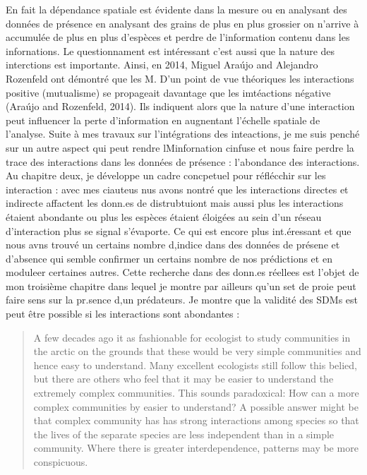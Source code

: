 En fait la dépendance spatiale est évidente dans la mesure ou en
analysant des données de présence en analysant des grains de plus en
plus grossier on n'arrive à accumulée de plus en plus d'espèces et
perdre de l'information contenu dans les infornations. Le questionnament
est intéressant c'est aussi que la nature des interctions est
importante. Ainsi, en 2014, Miguel Araújo and Alejandro Rozenfeld ont
démontré que les M. D'un point de vue théoriques les interactions
positive (mutualisme) se propageait davantage que les imtéactions
négative (Araújo and Rozenfeld, 2014). Ils indiquent alors que la nature
d'une interaction peut influencer la perte d'information en augnentant
l'échelle spatiale de l'analyse. Suite à mes travaux sur l'intégrations
des inteactions, je me suis penché sur un autre aspect qui peut rendre
lMinfornation cinfuse et nous faire perdre la trace des interactions
dans les données de présence : l'abondance des interactions. Au chapitre
deux, je développe un cadre concpetuel pour réflécchir sur les
interaction : avec mes ciauteus nus avons nontré que les interactions
directes et indirecte affactent les donn.es de distrubtuiont mais aussi
plus les interactions étaient abondante ou plus les espèces étaient
éloigées au sein d'un réseau d'interaction plus se signal s'évaporte. Ce
qui est encore plus int.éressant et que nous avns trouvé un certains
nombre d,indice dans des données de présene et d'absence qui semble
confirmer un certains nombre de nos prédictions et en moduleer certaines
autres. Cette recherche dans des donn.es réellees est l'objet de mon
troisième chapitre dans lequel je montre par ailleurs qu'un set de proie
peut faire sens sur la pr.sence d,un prédateurs. Je montre que la
validité des SDMs est peut être possible si les interactions sont
abondantes :

\begin{quote}
A few decades ago it as fashionable for ecologist to study communities
in the arctic on the grounds that these would be very simple communities
and hence easy to understand. Many excellent ecologists still follow
this belied, but there are others who feel that it may be easier to
understand the extremely complex communities. This sounds paradoxical:
How can a more complex communities by easier to understand? A possible
answer might be that complex community has has strong interactions among
species so that the lives of the separate species are less independent
than in a simple community. Where there is greater interdependence,
patterns may be more conspicuous.
\end{quote}

